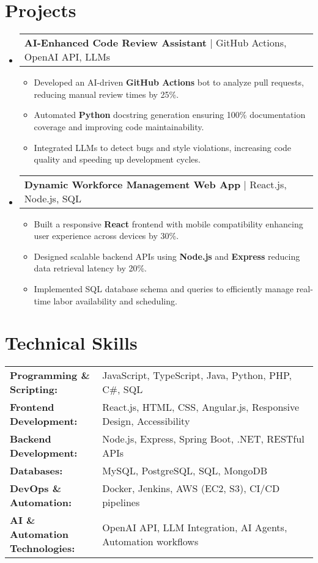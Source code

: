 \documentclass[letterpaper,11pt]{article}
\makeatletter
\newcommand{\resumeItem}[1]{
  \item\footnotesize{
    {#1 \vspace{-2pt}}
  }
}
\newcommand{\resumeProjectHeading}[2]{
    \item
    \begin{tabular*}{1.001\textwidth}{l@{\extracolsep{\fill}}r}
      \small#1 & \textbf{\small #2}\\
    \end{tabular*}\vspace{-7pt}
}
\newcommand{\resumeSubHeadingListStart}{\begin{itemize}[leftmargin=0pt, label={}]}
\newcommand{\resumeSubHeadingListEnd}{\end{itemize}}
\newcommand{\resumeItemListStart}{\begin{itemize}[leftmargin=*]}
\newcommand{\resumeItemListEnd}{\end{itemize}\vspace{-5pt}}
\makeatother
\begin{document}
\section{Projects}
    \vspace{-5pt}
    \resumeSubHeadingListStart
      \resumeProjectHeading
          {\textbf{AI-Enhanced Code Review Assistant} | GitHub Actions, OpenAI API, LLMs}{}
          \resumeItemListStart
              \resumeItem{Developed an AI-driven \textbf{GitHub Actions} bot to analyze pull requests, reducing manual review times by 25\%.}
              \resumeItem{Automated \textbf{Python} docstring generation ensuring 100\% documentation coverage and improving code maintainability.}
              \resumeItem{Integrated LLMs to detect bugs and style violations, increasing code quality and speeding up development cycles.}
          \resumeItemListEnd
          \vspace{-16pt}
      \resumeProjectHeading
          {\textbf{Dynamic Workforce Management Web App} | React.js, Node.js, SQL}{}
          \resumeItemListStart
              \resumeItem{Built a responsive \textbf{React} frontend with mobile compatibility enhancing user experience across devices by 30\%.}
              \resumeItem{Designed scalable backend APIs using \textbf{Node.js} and \textbf{Express} reducing data retrieval latency by 20\%.}
              \resumeItem{Implemented SQL database schema and queries to efficiently manage real-time labor availability and scheduling.}
          \resumeItemListEnd 
    \resumeSubHeadingListEnd
\vspace{-10pt}
\section{Technical Skills}
        \vspace{-14pt}
        \begin{table}[h]
            \footnotesize
            \begin{tabular}{p{0.3\linewidth} p{0.7\linewidth}}
                \textbf{Programming \& Scripting:} & JavaScript, TypeScript, Java, Python, PHP, C\#, SQL \\
                \textbf{Frontend Development:} & React.js, HTML, CSS, Angular.js, Responsive Design, Accessibility \\
                \textbf{Backend Development:} & Node.js, Express, Spring Boot, .NET, RESTful APIs \\
                \textbf{Databases:} & MySQL, PostgreSQL, SQL, MongoDB \\
                \textbf{DevOps \& Automation:} & Docker, Jenkins, AWS (EC2, S3), CI/CD pipelines \\
                \textbf{AI \& Automation Technologies:} & OpenAI API, LLM Integration, AI Agents, Automation workflows \\
            \end{tabular}
        \end{table}
\end{document}
